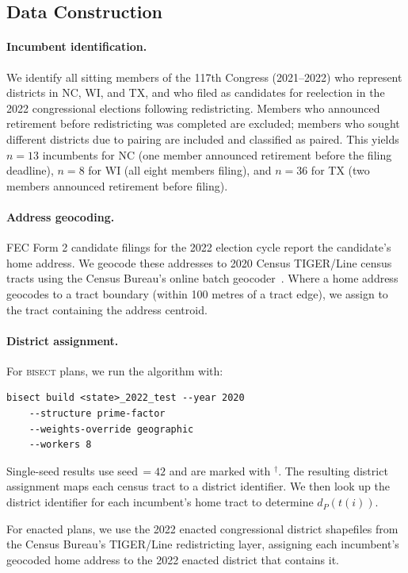 \label{sec:methodology}

\subsection{Data Construction}

\paragraph{Incumbent identification.}
We identify all sitting members of the 117th Congress (2021--2022) who represent
districts in NC, WI, and TX, and who filed as candidates for reelection in the
2022 congressional elections following redistricting. Members who announced retirement
before redistricting was completed are excluded; members who sought different districts
due to pairing are included and classified as paired. This yields $n = 13$ incumbents
for NC (one member announced retirement before the filing deadline), $n = 8$ for WI
(all eight members filing), and $n = 36$ for TX (two members announced retirement
before filing).

\paragraph{Address geocoding.}
FEC Form 2 candidate filings for the 2022 election cycle report the candidate's home
address. We geocode these addresses to 2020 Census TIGER/Line census tracts using the
Census Bureau's online batch geocoder~\citep{censusGeocoder}. Where a home address
geocodes to a tract boundary (within 100 metres of a tract edge), we assign to the
tract containing the address centroid.

\paragraph{District assignment.}
For \textsc{bisect} plans, we run the algorithm with:
\begin{verbatim}
bisect build <state>_2022_test --year 2020
    --structure prime-factor
    --weights-override geographic
    --workers 8
\end{verbatim}
Single-seed results use seed\,$=42$ and are marked with $^\dagger$. The resulting
district assignment maps each census tract to a district identifier. We then look up
the district identifier for each incumbent's home tract to determine $d_P(t(i))$.

For enacted plans, we use the 2022 enacted congressional district shapefiles from
the Census Bureau's TIGER/Line redistricting layer, assigning each incumbent's
geocoded home address to the 2022 enacted district that contains it.

